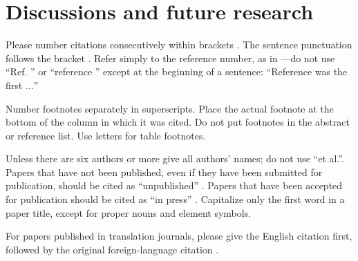 \documentclass[conference]{IEEEtran}
\begin{document}

\section*{Discussions and future research}

Please number citations consecutively within brackets \cite{b1}. The 
sentence punctuation follows the bracket \cite{b2}. Refer simply to the reference 
number, as in \cite{b3}---do not use ``Ref. \cite{b3}'' or ``reference \cite{b3}'' except at 
the beginning of a sentence: ``Reference \cite{b3} was the first $\ldots$''

Number footnotes separately in superscripts. Place the actual footnote at 
the bottom of the column in which it was cited. Do not put footnotes in the 
abstract or reference list. Use letters for table footnotes.

Unless there are six authors or more give all authors' names; do not use 
``et al.''. Papers that have not been published, even if they have been 
submitted for publication, should be cited as ``unpublished'' \cite{b4}. Papers 
that have been accepted for publication should be cited as ``in press'' \cite{b5}. 
Capitalize only the first word in a paper title, except for proper nouns and 
element symbols.

For papers published in translation journals, please give the English 
citation first, followed by the original foreign-language citation \cite{b6}.

\end{document}
